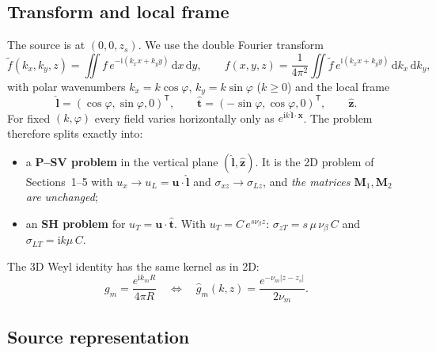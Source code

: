 \documentclass[11pt,a4paper]{article}
\newcommand{\ii}{\mathrm{i}}
\newcommand{\dd}{\mathrm{d}}
\begin{document}
\subsection{Transform and local frame}

The source is at $(0,0,z_s)$. We use the double Fourier transform
\begin{equation}
  \tilde f(k_x,k_y,z)=\iint f\,e^{-\ii(k_xx+k_yy)}\,\dd x\,\dd y,\qquad
  f(x,y,z)=\frac{1}{4\pi^2}\iint \tilde f\,e^{\ii(k_xx+k_yy)}\,\dd k_x\,\dd k_y ,
\end{equation}
with polar wavenumbers $k_x=k\cos\varphi$, $k_y=k\sin\varphi$ ($k\ge0$) and the local frame
\begin{equation}
  \hat{\mathbf l}=(\cos\varphi,\sin\varphi,0)^{\mathsf T},\qquad
  \hat{\mathbf t}=(-\sin\varphi,\cos\varphi,0)^{\mathsf T},\qquad \hat{\mathbf z}.
\end{equation}
For fixed $(k,\varphi)$ every field varies horizontally only as $e^{\ii k\,\hat{\mathbf l}\cdot\mathbf x}$.
The problem therefore splits exactly into:
\begin{itemize}
  \item a \textbf{P--SV problem} in the vertical plane $(\hat{\mathbf l},\hat{\mathbf z})$. It is the 2D
  problem of Sections~1--5 with $u_x\to u_L=\mathbf u\cdot\hat{\mathbf l}$ and
  $\sigma_{xz}\to\sigma_{Lz}$, and \emph{the matrices $\mathbf M_1,\mathbf M_2$ are unchanged};
  \item an \textbf{SH problem} for $u_T=\mathbf u\cdot\hat{\mathbf t}$. With
  $u_T=C\,e^{s\nu_\beta z}$: $\sigma_{zT}=s\,\mu\,\nu_\beta\,C$ and $\sigma_{LT}=\ii k\mu\,C$.
\end{itemize}
The 3D Weyl identity has the same kernel as in 2D:
\begin{equation}
  g_m=\frac{e^{\ii k_mR}}{4\pi R}
  \quad\Longleftrightarrow\quad
  \hat g_m(k,z)=\frac{e^{-\nu_m|z-z_s|}}{2\nu_m}.
\end{equation}

\subsection{Source representation}
\end{document}
